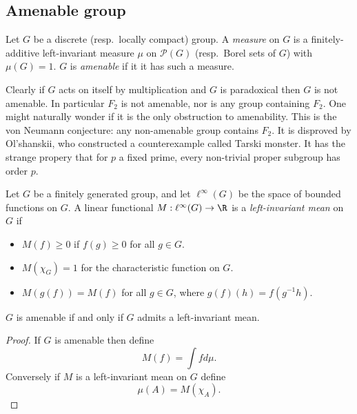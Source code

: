 \documentclass[a4paper]{article}
\begin{document}
\subsection{Amenable group}

\begin{definition}[amenable]
  Let \(G\) be a discrete (resp.\ locally compact) group. A \emph{measure} on \(G\) is a finitely-additive left-invariant measure \(\mu\) on \(\mathcal P(G)\) (resp.\ Borel sets of \(G\)) with \(\mu(G) = 1\). \(G\) is \emph{amenable} if it it has such a measure.
\end{definition}

\begin{remark}
  Clearly if \(G\) acts on itself by multiplication and \(G\) is paradoxical then \(G\) is not amenable. In particular \(F_2\) is not amenable, nor is any group containing \(F_2\). One might naturally wonder if it is the only obstruction to amenability. This is the von Neumann conjecture: any non-amenable group contains \(F_2\). It is disproved by Ol'shanskii, who constructed a counterexample called Tarski monster. It has the strange propery that for \(p\) a fixed prime, every non-trivial proper subgroup has order \(p\).
\end{remark}

\begin{definition}
  Let \(G\) be a finitely generated group, and let \(\ell^\infty(G)\) be the space of bounded functions on \(G\). A linear functional \(M: \ell^\infty(G) \to \R\) is a \emph{left-invariant mean} on \(G\) if
  \begin{itemize}
  \item \(M(f) \geq 0\) if \(f(g) \geq 0\) for all \(g \in G\).
  \item \(M(\chi_G) = 1\) for the characteristic function on \(G\).
  \item \(M(g(f)) = M(f)\) for all \(g \in G\), where \(g(f)(h) = f(g^{-1}h)\).
  \end{itemize}
\end{definition}

\begin{proposition}
  \(G\) is amenable if and only if \(G\) admits a left-invariant mean.
\end{proposition}

\begin{proof}
  If \(G\) is amenable then define
  \[
    M(f) = \int f d \mu.
  \]
  Conversely if \(M\) is a left-invariant mean on \(G\) define
  \[
    \mu(A) = M(\chi_A).
  \]
\end{proof}
\end{document}
